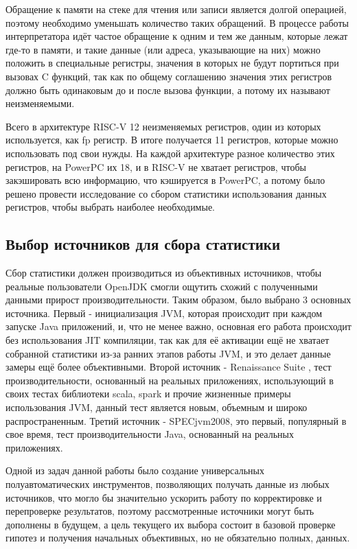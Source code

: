 \newpage
{}

Обращение к памяти на стеке для чтения или записи является долгой операцией, поэтому необходимо уменьшать количество таких обращений. В процессе работы интерпретатора идёт частое обращение к одним и тем же данным, которые лежат где-то в памяти, и такие данные (или адреса, указывающие на них) можно положить в специальные регистры, значения в которых не будут портиться при вызовах C функций, так как по общему соглашению значения этих регистров должно быть одинаковым до и после вызова функции, а потому их называют неизменяемыми.

Всего в архитектуре RISC-V 12 неизменяемых регистров, один из которых используется, как fp регистр. В итоге получается 11 регистров, которые можно использовать под свои нужды. На каждой архитектуре разное количество этих регистров, на PowerPC их 18, и в RISC-V не хватает регистров, чтобы закэшировать всю информацию, что кэшируется в PowerPC, а потому было решено провести исследование со сбором статистики использования данных регистров, чтобы выбрать наиболее необходимые.



\subsection{Выбор источников для сбора статистики}

Сбор статистики должен производиться из объективных источников, чтобы реальные пользователи OpenJDK смогли ощутить схожий с полученными данными прирост производительности. Таким образом, было выбрано 3 основных источника.
Первый - инициализация JVM, которая происходит при каждом запуске Java приложений, и, что не менее важно, основная его работа происходит без использования JIT компиляции, так как для её активации ещё не хватает собранной статистики из-за ранних этапов работы JVM, и это делает данные замеры ещё более объективными.
Второй источник - Renaissance Suite \cite{renaissance}, тест производительности, основанный на реальных приложениях, использующий в своих тестах библиотеки scala, spark и прочие жизненные примеры использования JVM, данный тест является новым, объемным и широко распространенным.
Третий источник - SPECjvm2008, это первый, популярный в свое время, тест производительности Java, основанный на реальных приложениях.

Одной из задач данной работы было создание универсальных полуавтоматических инструментов, позволяющих получать данные из любых источников, что могло бы значительно ускорить работу по корректировке и перепроверке результатов, поэтому рассмотренные источники могут быть дополнены в будущем, а цель текущего их выбора состоит в базовой проверке гипотез и получения начальных объективных, но не обязательно полных, данных. 



